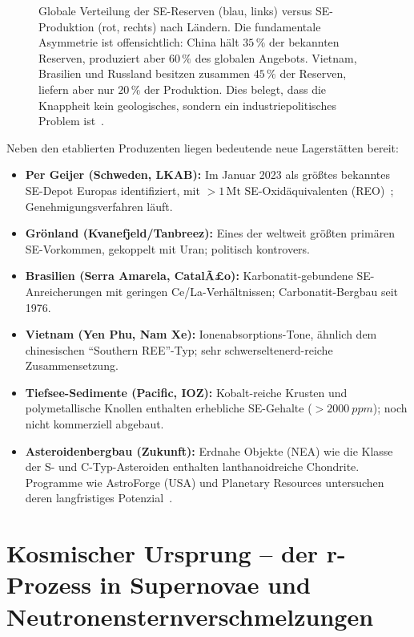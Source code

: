 ﻿\documentclass[12pt, a4paper]{report}
\theoremstyle{definition}
\theoremstyle{remark}
\begin{document}
\begin{figure}[htbp]
\caption{Globale Verteilung der SE-Reserven (blau, links) versus SE-Produktion
  (rot, rechts) nach Ländern. Die fundamentale Asymmetrie ist offensichtlich:
  China hält $35\,\%$ der bekannten Reserven, produziert aber $60\,\%$ des
  globalen Angebots. Vietnam, Brasilien und Russland besitzen zusammen
  $45\,\%$ der Reserven, liefern aber nur $20\,\%$ der Produktion. Dies
  belegt, dass die Knappheit kein geologisches, sondern ein
  industriepolitisches Problem ist~\cite{usgs2024,massari2013}.}
\label{fig:re_reserven}
\end{figure}

Neben den etablierten Produzenten liegen bedeutende neue Lagerstätten bereit:
\begin{itemize}
  \item \textbf{Per Geijer (Schweden, LKAB):} Im Januar 2023 als größtes
        bekanntes SE-Depot Europas identifiziert, mit $>1\,\text{Mt}$ SE-Oxidäquivalenten
        (REO)~\cite{lkab2023}; Genehmigungsverfahren läuft.
  \item \textbf{Grönland (Kvanefjeld/Tanbreez):} Eines der weltweit größten
        primären SE-Vorkommen, gekoppelt mit Uran; politisch kontrovers.
  \item \textbf{Brasilien (Serra Amarela, CatalÃ£o):} Karbonatit-gebundene
        SE-Anreicherungen mit geringen Ce/La-Verhältnissen; Carbonatit-Bergbau
        seit 1976.
  \item \textbf{Vietnam (Yen Phu, Nam Xe):} Ionenabsorptions-Tone, ähnlich
        dem chinesischen ``Southern REE''-Typ; sehr schwerseltenerd-reiche
        Zusammensetzung.
  \item \textbf{Tiefsee-Sedimente (Pacific, IOZ):} Kobalt-reiche Krusten und
        polymetallische Knollen enthalten erhebliche SE-Gehalte
        ($>\SI{2000}{ppm}$); noch nicht kommerziell abgebaut.
  \item \textbf{Asteroidenbergbau (Zukunft):} Erdnahe Objekte (NEA) wie die
        Klasse der S- und C-Typ-Asteroiden enthalten lanthanoidreiche
        Chondrite. Programme wie AstroForge (USA) und Planetary Resources
        untersuchen deren langfristiges Potenzial~\cite{iea2024}.
\end{itemize}

\section{Kosmischer Ursprung -- der r-Prozess in Supernovae und
            Neutronensternverschmelzungen}
\label{ssec:re_kosmos}
\end{document}
